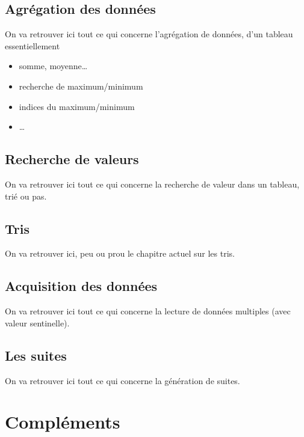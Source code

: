 \documentclass[a4paper,doubleside]{book}
\begin{document}
		\chapter{Agrégation des données}
			\begin{Note}
			On va retrouver ici tout ce qui concerne l'agrégation
			de données, d'un tableau essentiellement
			\begin{itemize}
			\item somme, moyenne\dots
			\item recherche de maximum/minimum
			\item indices du maximum/minimum
			\item \dots
			\end{itemize}
			\end{Note}
		\chapter{Recherche de valeurs}
			\begin{Note}
			On va retrouver ici tout ce qui concerne la recherche
			de valeur dans un tableau, trié ou pas.
			\end{Note}
		\chapter{Tris}
			\begin{Note}
			On va retrouver ici,
			peu ou prou le chapitre actuel sur les tris.
			\end{Note}
		\chapter{Acquisition des données}
			\begin{Note}
			On va retrouver ici tout ce qui concerne la lecture
			de données multiples (avec valeur sentinelle).
			\end{Note}
		\chapter{Les suites}
			\begin{Note}
			On va retrouver ici tout ce qui concerne la génération 
			de suites.
			\end{Note}
	
	\part{Compléments}
\end{document}
